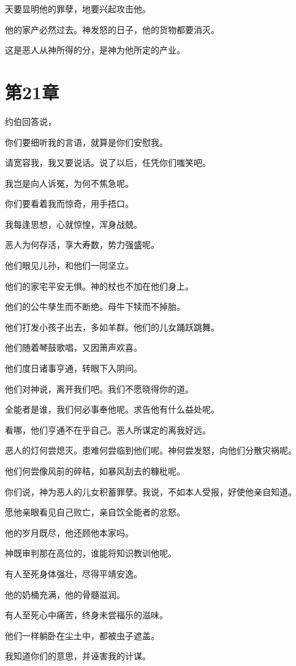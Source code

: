\documentclass[12pt,oneside]{book}
\begin{document}
天要显明他的罪孽，地要兴起攻击他。

他的家产必然过去。神发怒的日子，他的货物都要消灭。

这是恶人从神所得的分，是神为他所定的产业。


\chapter{第21章}
约伯回答说，

你们要细听我的言语，就算是你们安慰我。

请宽容我，我又要说话。说了以后，任凭你们嗤笑吧。

我岂是向人诉冤，为何不焦急呢。

你们要看着我而惊奇，用手捂口。

我每逢思想，心就惊惶，浑身战兢。

恶人为何存活，享大寿数，势力强盛呢。

他们眼见儿孙，和他们一同坚立。

他们的家宅平安无惧。神的杖也不加在他们身上。

他们的公牛孳生而不断绝。母牛下犊而不掉胎。

他们打发小孩子出去，多如羊群。他们的儿女踊跃跳舞。

他们随着琴鼓歌唱，又因箫声欢喜。

他们度日诸事亨通，转眼下入阴间。

他们对神说，离开我们吧。我们不愿晓得你的道。

全能者是谁，我们何必事奉他呢。求告他有什么益处呢。

看哪，他们亨通不在乎自己。恶人所谋定的离我好远。

恶人的灯何尝熄灭。患难何尝临到他们呢。神何尝发怒，向他们分散灾祸呢。

他们何尝像风前的碎秸，如暴风刮去的糠秕呢。

你们说，神为恶人的儿女积蓄罪孽。我说，不如本人受报，好使他亲自知道。

愿他亲眼看见自己败亡，亲自饮全能者的忿怒。

他的岁月既尽，他还顾他本家吗。

神既审判那在高位的，谁能将知识教训他呢。

有人至死身体强壮，尽得平靖安逸。

他的奶桶充满，他的骨髓滋润。

有人至死心中痛苦，终身未尝福乐的滋味。

他们一样躺卧在尘土中，都被虫子遮盖。

我知道你们的意思，并诬害我的计谋。
\end{document}
